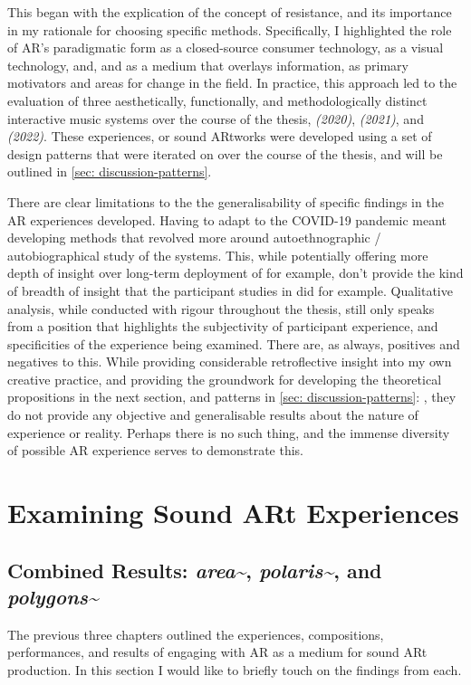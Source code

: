 This began with the explication of the concept of resistance, and its importance in my rationale for choosing specific methods. Specifically, I highlighted the role of AR's paradigmatic form as a closed-source consumer technology, as a visual technology, and, and as a medium that overlays information, as primary motivators and areas for change in the field. In practice, this approach led to the evaluation of three aesthetically, functionally, and methodologically distinct interactive music systems over the course of the thesis, \textit{ (2020)}, \textit{ (2021)}, and \textit{ (2022)}. These experiences, or sound ARtworks were developed using a set of design patterns that were iterated on over the course of the thesis, and will be outlined in \autoref{sec: discussion-patterns}. 

There are clear limitations to the the generalisability of specific findings in the AR experiences developed. Having to adapt to the COVID-19 pandemic meant developing methods that revolved more around autoethnographic / autobiographical study of the systems. This, while potentially offering more depth of insight over long-term deployment of  for example, don't provide the kind of breadth of insight that the participant studies in  did for example. Qualitative analysis, while conducted with rigour throughout the thesis, still only speaks from a position that highlights the subjectivity of participant experience, and specificities of the experience being examined. There are, as always, positives and negatives to this. While providing considerable retroflective insight into my own creative practice, and providing the groundwork for developing the theoretical propositions in the next section, and patterns in \autoref{sec: discussion-patterns}: , they do not provide any objective and generalisable results about the nature of experience or reality. Perhaps there is no such thing, and the immense diversity of possible AR experience serves to demonstrate this.



\section{Examining Sound ARt Experiences} \label{sec: discussion-medium}
\subsection{Combined Results: \textit{area\textasciitilde{}}, \textit{polaris\textasciitilde{}}, and \textit{polygons\textasciitilde{}}}
The previous three chapters outlined the experiences, compositions, performances, and results of engaging with AR as a medium for sound ARt production. In this section I would like to briefly touch on the findings from each.

